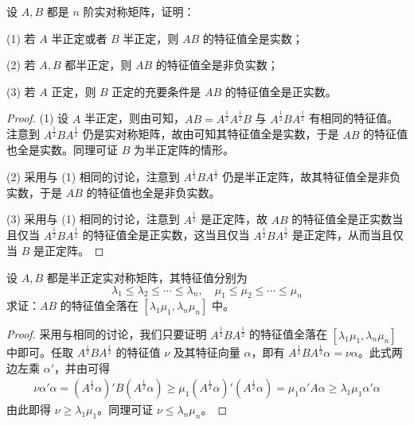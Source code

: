 \documentclass[../../main.tex]{subfiles}
\begin{document}
\begin{proposition}\label{proposition:例9.64}
设 \(A,B\) 都是 \(n\) 阶实对称矩阵，证明：

(1) 若 \(A\) 半正定或者 \(B\) 半正定，则 \(AB\) 的特征值全是实数；

(2) 若 \(A,B\) 都半正定，则 \(AB\) 的特征值全是非负实数；

(3) 若 \(A\) 正定，则 \(B\) 正定的充要条件是 \(AB\) 的特征值全是正实数。
\end{proposition}
\begin{proof}
(1) 设 \(A\) 半正定，则由可知，\(AB = A^{\frac{1}{2}}A^{\frac{1}{2}}B\) 与 \(A^{\frac{1}{2}}BA^{\frac{1}{2}}\) 有相同的特征值。注意到 \(A^{\frac{1}{2}}BA^{\frac{1}{2}}\) 仍是实对称矩阵，故由可知其特征值全是实数，于是 \(AB\) 的特征值也全是实数。同理可证 \(B\) 为半正定阵的情形。

(2) 采用与 (1) 相同的讨论，注意到 \(A^{\frac{1}{2}}BA^{\frac{1}{2}}\) 仍是半正定阵，故其特征值全是非负实数，于是 \(AB\) 的特征值也全是非负实数。

(3) 采用与 (1) 相同的讨论，注意到 \(A^{\frac{1}{2}}\) 是正定阵，故 \(AB\) 的特征值全是正实数当且仅当 \(A^{\frac{1}{2}}BA^{\frac{1}{2}}\) 的特征值全是正实数，这当且仅当 \(A^{\frac{1}{2}}BA^{\frac{1}{2}}\) 是正定阵，从而当且仅当 \(B\) 是正定阵。 
\end{proof}

\begin{proposition}\label{proposition:例9.65}
设 \(A,B\) 都是半正定实对称矩阵，其特征值分别为
\[
\lambda_1 \leq \lambda_2 \leq \cdots \leq \lambda_n,\quad \mu_1 \leq \mu_2 \leq \cdots \leq \mu_n
\]
求证：\(AB\) 的特征值全落在 \([\lambda_1\mu_1,\lambda_n\mu_n]\) 中。
\end{proposition}
\begin{proof}
采用与相同的讨论，我们只要证明 \(A^{\frac{1}{2}}BA^{\frac{1}{2}}\) 的特征值全落在 \([\lambda_1\mu_1,\lambda_n\mu_n]\) 中即可。任取 \(A^{\frac{1}{2}}BA^{\frac{1}{2}}\) 的特征值 \(\nu\) 及其特征向量 \(\alpha\)，即有 \(A^{\frac{1}{2}}BA^{\frac{1}{2}}\alpha = \nu\alpha\)。此式两边左乘 \(\alpha'\)，并由可得
\begin{align*}
\nu\alpha'\alpha = (A^{\frac{1}{2}}\alpha)'B(A^{\frac{1}{2}}\alpha) \geq \mu_1(A^{\frac{1}{2}}\alpha)'(A^{\frac{1}{2}}\alpha) = \mu_1\alpha'A\alpha \geq \lambda_1\mu_1\alpha'\alpha
\end{align*}
由此即得 \(\nu \geq \lambda_1\mu_1\)。同理可证 \(\nu \leq \lambda_n\mu_n\)。
\end{proof}
\end{document}
